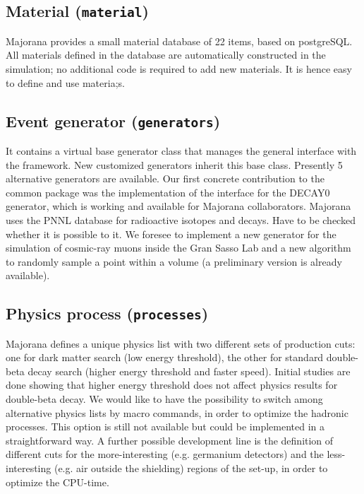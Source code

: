 \documentclass[a4paper,12pt,twoside]{article}
\begin{document}
\subsection{Material ({\tt material}) }
Majorana provides a small material database of 22 items, based 
on postgreSQL. All materials defined in the database are automatically 
constructed in the simulation; no additional code is required to 
add new materials. It is hence easy to define and use materia;s.

\subsection{Event generator ({\tt generators})}
It contains a virtual base generator class that manages the general interface 
with the framework. New customized generators inherit this base class. 
Presently 5 alternative generators are available. 
Our first concrete contribution to the common package was the implementation of  
the interface for the DECAY0 generator, which is working and available for 
Majorana collaborators.
Majorana uses the PNNL database for radioactive isotopes and decays.
Have to be checked whether it is possible to it.
We foresee to implement a new generator for the simulation of cosmic-ray 
muons inside the Gran Sasso Lab and a new algorithm to randomly sample 
a point within a volume (a preliminary version is already available).

\subsection{Physics process ({\tt processes})}
Majorana defines a unique physics list with two different sets of 
production cuts: one for dark matter search (low energy threshold), 
the other for standard double-beta decay search 
(higher energy threshold and faster speed). Initial 
studies are done showing
that higher energy threshold does not affect physics results
for double-beta decay. 
We would like to have the possibility to switch among 
alternative physics lists by macro commands, in order to optimize the 
hadronic processes. This option is still not available but could be implemented 
in a straightforward way. A further possible development line is the definition of 
different cuts for the more-interesting (e.g. germanium detectors) and 
the less-interesting (e.g. air outside the shielding) regions of the set-up, in 
order to optimize the CPU-time. 
\end{document}
